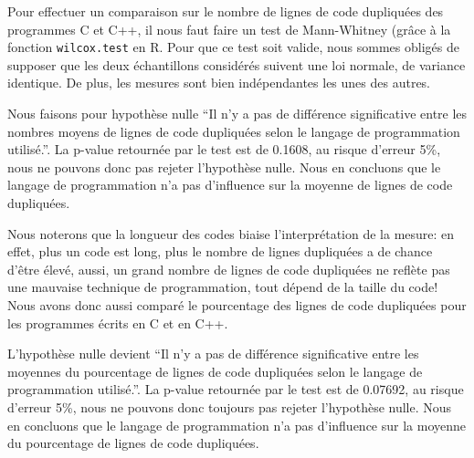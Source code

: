 Pour effectuer un comparaison sur le nombre de lignes de code dupliquées des
programmes C et C++, il nous faut faire un test de Mann-Whitney (grâce à la
fonction \lstinline{wilcox.test} en R. Pour que ce test soit valide, nous sommes
obligés de supposer que les deux échantillons considérés suivent une loi
normale, de variance identique. De plus, les mesures sont bien indépendantes les
unes des autres.

Nous faisons pour hypothèse nulle ``Il n'y a pas de différence significative entre les
nombres moyens de lignes de code dupliquées selon le langage de programmation
utilisé.''. La p-value retournée par le test est de 0.1608, au risque d'erreur
5\%, nous ne pouvons donc pas rejeter l'hypothèse nulle. Nous en concluons que
le langage de programmation n'a pas d'influence sur la moyenne de lignes de code
dupliquées.

Nous noterons que la longueur des codes biaise l'interprétation de la mesure: en
effet, plus un code est long, plus le nombre de lignes dupliquées a de chance
d'être élevé, aussi, un grand nombre de lignes de code dupliquées ne reflète pas
une mauvaise technique de programmation, tout dépend de la taille du code! Nous
avons donc aussi comparé le pourcentage des lignes de code dupliquées pour les
programmes écrits en C et en C++.

L'hypothèse nulle devient ``Il n'y a pas de différence significative entre les
moyennes du pourcentage de lignes de code dupliquées selon le langage de
programmation utilisé.''. La p-value retournée par le test est de 0.07692, au
risque d'erreur 5\%, nous ne pouvons donc toujours pas rejeter l'hypothèse
nulle. Nous en concluons que le langage de programmation n'a pas d'influence sur
la moyenne du pourcentage de lignes de code dupliquées.

